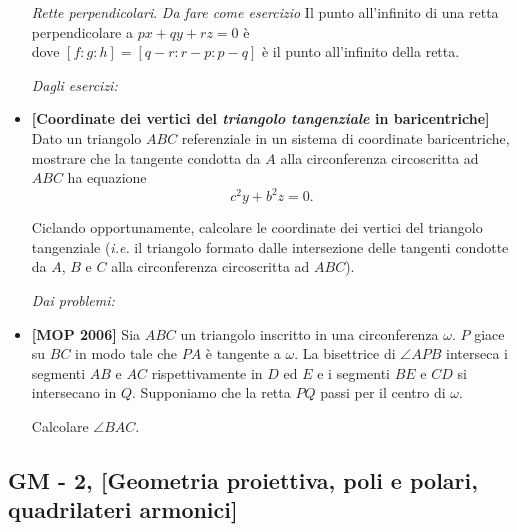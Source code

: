 \begin{itemize}
	\emph{Rette perpendicolari}. \emph{Da fare come esercizio}
	Il punto all'infinito di una retta perpendicolare a $px+qy+rz=0$ è
	\begin{equation}
	[S_Bg-S_Ch:S_Ch-S_Af:S_Af-S_Bg]
	\end{equation}
	dove $[f:g:h]=[q-r:r-p:p-q]$ è il punto all'infinito della retta.
	
	\emph{Dagli esercizi:}
	\item \textbf{[Coordinate dei vertici del \textit{triangolo tangenziale} in baricentriche]}  Dato un triangolo $ABC$ referenziale in un sistema di coordinate baricentriche, mostrare che la tangente condotta da $A$ alla circonferenza circoscritta ad $ABC$ ha equazione
	\begin{equation}
	c^2y+b^2z=0.
	\end{equation}
	
	Ciclando opportunamente, calcolare le coordinate dei vertici del triangolo tangenziale (\textit{i.e.} il triangolo formato dalle intersezione delle tangenti condotte da $A$, $B$ e $C$ alla circonferenza circoscritta ad $ABC$).
	
	\emph{Dai problemi:}
	\item \textbf{[MOP 2006]} Sia $ABC$ un triangolo inscritto in una circonferenza $\omega$. $P$ giace su $BC$ in modo tale che $PA$ è tangente a $\omega$. La bisettrice di $\angle APB$ interseca i segmenti $AB$ e $AC$ rispettivamente in $D$ ed $E$ e i segmenti $BE$ e $CD$ si intersecano in $Q$. Supponiamo che la retta $PQ$ passi per il centro di $\omega$. 
	
	Calcolare $\angle BAC$.
	
	
	 
	
\end{itemize}
\clearpage
\subsection{GM - 2, [Geometria proiettiva, poli e polari, quadrilateri armonici]}

